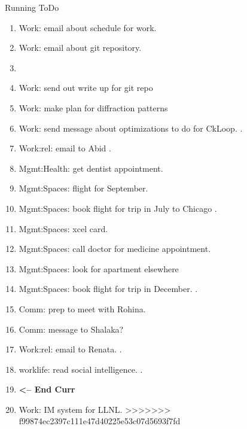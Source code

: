 \begin{columns}
\begin{column}{0.6\linewidth}
\begin{block}{Running ToDo}
\begin{enumerate}
        \item \tiny Work: email about schedule for work. 
        \item \tiny Work: email about git repository. 
        \item \tiny 

        \item \tiny Work: send out write up for git repo 
        \item \tiny Work: make plan for diffraction patterns
        \item \tiny Work: send message about optimizations to do for
          CkLoop.  .
         
        \item \tiny Work:rel: email to Abid . 

        \item \tiny Mgmt:Health: get dentist appointment. 

        \item \tiny Mgmt:Spaces: flight for September. 
        \item \tiny Mgmt:Spaces: book flight for trip in July to Chicago .   
          
        \item \tiny Mgmt:Spaces: xcel card. 
        \item \tiny Mgmt:Spaces: call doctor for medicine appointment.

        \item \tiny Mgmt:Spaces: look for apartment elsewhere          

        \item \tiny Mgmt:Spaces: book flight for trip in December. .

        \item \tiny  Comm: prep to meet with Rohina. 
        \item \tiny Comm: message to Shalaka?
        \item \tiny Work:rel: email to Renata. .
        \item \tiny worklife: read social intelligence. .           
          
        \item \tiny \textbf{ <-- End Curr } 
          
        \item \tiny Work: IM system for LLNL.
>>>>>>> f99874ec2397c111e47d40225e53c07d5693f7fd
        \end{enumerate}
      \end{block}
      

\end{column}
\end{columns}
